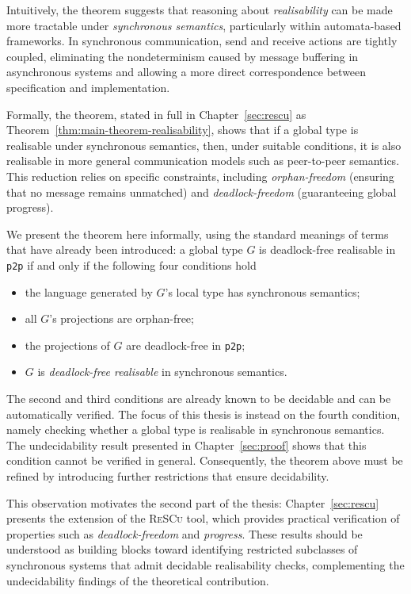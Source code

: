 Intuitively, the theorem suggests that reasoning about \emph{realisability} can be 
made more tractable under \emph{synchronous semantics}, particularly within 
automata-based frameworks.  
In synchronous communication, send and receive actions are tightly coupled, 
eliminating the nondeterminism caused by message buffering in asynchronous systems 
and allowing a more direct correspondence between specification and implementation.

Formally, the theorem, stated in full in Chapter~\ref{sec:rescu} as 
Theorem~\ref{thm:main-theorem-realisability}, shows that if a global type is 
realisable under synchronous semantics, then, under suitable conditions, it is 
also realisable in more general communication models such as 
peer-to-peer semantics.  
This reduction relies on specific constraints, including 
\emph{orphan-freedom} (ensuring that no message remains unmatched) and 
\emph{deadlock-freedom} (guaranteeing global progress).

We present the theorem here informally, using the standard meanings of
terms that have already been introduced:
a global type $G$ is deadlock-free realisable in \verb|p2p| if and only if
the following four conditions hold
\begin{itemize}
  \item the language generated by $G$'s local type has synchronous semantics;
  \item all $G$'s projections are orphan-free;
  \item the projections of $G$ are deadlock-free in \verb|p2p|;
  \item $G$ is \emph{deadlock-free realisable} in synchronous semantics.
\end{itemize}

The second and third conditions are already known to be decidable and 
can be automatically verified. The focus of this thesis is instead on 
the fourth condition, namely checking whether a global type is 
realisable in synchronous semantics. The undecidability result 
presented in Chapter~\ref{sec:proof} shows that this condition cannot 
be verified in general. Consequently, the theorem above must be refined 
by introducing further restrictions that ensure decidability.  

This observation motivates the second part of the thesis: 
Chapter~\ref{sec:rescu} presents the extension of the 
\textsc{ReSCu} tool, which provides practical verification of 
properties such as \emph{deadlock-freedom} and \emph{progress}. These 
results should be understood as building blocks toward identifying 
restricted subclasses of synchronous systems that admit decidable 
realisability checks, complementing the undecidability findings of 
the theoretical contribution.

